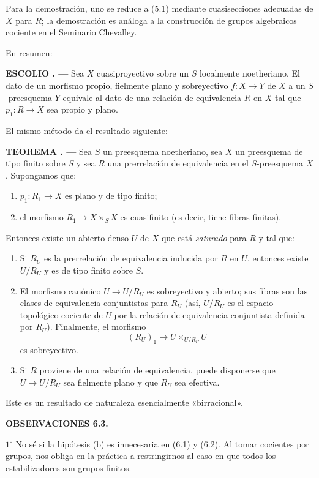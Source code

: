 \documentclass[11pt,twoside,openany]{book}
\numberwithin{equation}{section}
\newcommand{\src}[1]{%
  \phantomsection\hypertarget{src:#1}{}%
  \marginpar{\raggedleft\footnotesize\sffamily #1}%
}
\theoremstyle{plain}
\theoremstyle{definition}
\theoremstyle{remark}
\newcommand{\result}[2]{%
  \par\medskip\noindent\textbf{#1%
  \if\relax\detokenize{#2}\relax\else\space#2\fi. ---}\enspace
}
\newcommand{\FgaUnitKey}{frontmatter}
\renewcommand{\src}[1]{%
  \phantomsection\hypertarget{src:\FgaUnitKey:#1}{}%
  \marginpar{\raggedleft\footnotesize\sffamily #1}%
}
\theoremstyle{plain}
\theoremstyle{definition}
\theoremstyle{remark}
\begin{document}
Para la demostración, uno se reduce a (5.1) mediante cuasisecciones adecuadas
de $X$ para $R$; la demostración es análoga a la construcción de grupos
algebraicos cociente en el Seminario Chevalley.

En resumen:

\result{ESCOLIO}{} Sea $X$ cuasiproyectivo sobre un $S$ localmente
noetheriano. El dato de un morfismo propio, fielmente plano y sobreyectivo
$f:X\to Y$ de $X$ a un $S$-preesquema $Y$ equivale al dato de una relación de
equivalencia $R$ en $X$ tal que $p_1:R\to X$ sea propio y plano.

El mismo método da el resultado siguiente:

\result{TEOREMA}{6.2} Sea $S$ un preesquema noetheriano, sea $X$ un
preesquema de tipo finito sobre $S$ y sea $R$ una prerrelación de equivalencia
en el $S$-preesquema $X$. Supongamos que:
\begin{enumerate}
\item[(a)] $p_1:R_1\to X$ es plano y de tipo finito;
\item[(b)] el morfismo $R_1\to X\times_S X$ es cuasifinito (es decir, tiene
fibras finitas).
\end{enumerate}
Entonces existe un abierto denso $U$ de $X$ que está \emph{saturado} para $R$
y tal que:
\begin{enumerate}
\item[(i)] Si $R_U$ es la prerrelación de equivalencia inducida por $R$ en
$U$, entonces existe $U/R_U$ y es de tipo finito sobre $S$.

\item[(ii)] El morfismo canónico $U\to U/R_U$ es sobreyectivo y abierto; sus
fibras son las clases de equivalencia conjuntistas para $R_U$ (así,
$U/R_U$ es el espacio topológico cociente de $U$ por la relación de
equivalencia conjuntista definida por $R_U$). Finalmente, el morfismo
\[
  (R_U)_1\longrightarrow U\times_{U/R_U}U
\]
es sobreyectivo.
\src{114}

\item[(iii)] Si $R$ proviene de una relación de equivalencia, puede disponerse
que $U\to U/R_U$ sea fielmente plano y que $R_U$ sea efectiva.
\end{enumerate}

Este es un resultado de naturaleza esencialmente «birracional».

\medskip
\noindent\textbf{OBSERVACIONES 6.3.}

\smallskip
\noindent $1^\circ$ No sé si la hipótesis (b) es innecesaria en (6.1) y
(6.2). Al tomar cocientes por grupos, nos obliga en la práctica a
restringirnos al caso en que todos los estabilizadores son grupos finitos.
\end{document}

